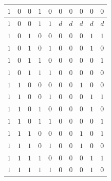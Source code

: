 \documentclass[12pt,a4paper]{report}
\begin{document}
\begin{tabular}{|c|cc|cc||c|cccc|}
    \hline
    $1$ & $0$ & $0$ & $1$ & $0$ & $0$ & $0$ & $0$ & $0$ & $0$\\
    \hline
    $1$ & $0$ & $0$ & $1$ & $1$ & $d$ & $d$ & $d$ & $d$ & $d$\\
    \hline
    $1$ & $0$ & $1$ & $0$ & $0$ & $0$ & $0$ & $0$ & $1$ & $1$\\
    \hline
    $1$ & $0$ & $1$ & $0$ & $1$ & $0$ & $0$ & $0$ & $1$ & $0$\\
    \hline
    $1$ & $0$ & $1$ & $1$ & $0$ & $0$ & $0$ & $0$ & $0$ & $1$\\
    \hline
    $1$ & $0$ & $1$ & $1$ & $1$ & $0$ & $0$ & $0$ & $0$ & $0$\\
    \hline
    $1$ & $1$ & $0$ & $0$ & $0$ & $0$ & $0$ & $1$ & $0$ & $0$\\
    \hline
    $1$ & $1$ & $0$ & $0$ & $1$ & $0$ & $0$ & $0$ & $1$ & $1$\\
    \hline
    $1$ & $1$ & $0$ & $1$ & $0$ & $0$ & $0$ & $0$ & $1$ & $0$\\
    \hline
    $1$ & $1$ & $0$ & $1$ & $1$ & $0$ & $0$ & $0$ & $0$ & $1$\\
    \hline
    $1$ & $1$ & $1$ & $0$ & $0$ & $0$ & $0$ & $1$ & $0$ & $1$\\
    \hline
    $1$ & $1$ & $1$ & $0$ & $1$ & $0$ & $0$ & $1$ & $0$ & $0$\\
    \hline
    $1$ & $1$ & $1$ & $1$ & $0$ & $0$ & $0$ & $0$ & $1$ & $1$\\
    \hline
    $1$ & $1$ & $1$ & $1$ & $1$ & $0$ & $0$ & $0$ & $1$ & $0$\\
    \hline
\end{tabular}
\normalsize
\end{document}
